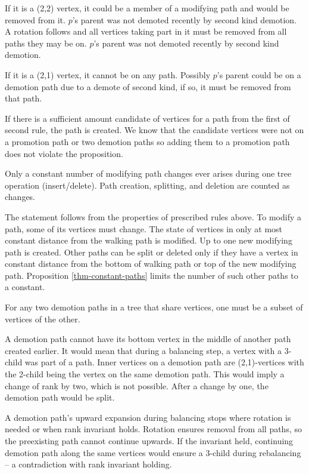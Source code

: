 \begin{myproof}
If it is a (2,2) vertex, it could be a member of a modifying path and would be removed from it. $p$'s parent was not demoted recently by second kind demotion. A rotation follows and all vertices taking part in it must be removed from all paths they may be on. $p$'s parent was not demoted recently by second kind demotion.

If it is a (2,1) vertex, it cannot be on any path. Possibly $p$'s parent could be on a demotion path due to a demote of second kind, if so, it must be removed from that path.

If there is a sufficient amount candidate of vertices for a path from the first of second rule, the path is created. We know that the candidate vertices were not on a promotion path or two demotion paths so adding them to a promotion path does not violate the proposition.
\end{myproof}

\begin{prop}
Only a constant number of modifying path changes ever arises during one tree operation (insert/delete). Path creation, splitting, and deletion are counted as changes.
\end{prop}

\begin{myproof}
The statement follows from the properties of prescribed rules above. To modify a path, some of its vertices must change. The state of vertices in only at most constant distance from the walking path is modified. Up to one new modifying path is created. Other paths can be split or deleted only if they have a vertex in constant distance from the bottom of walking path or top of the new modifying path. Proposition \ref{thm-constant-paths} limits the number of such other paths to a constant.
\end{myproof}

\begin{prop}
For any two demotion paths in a tree that share vertices, one must be a subset of vertices of the other.
\end{prop}

\begin{myproof}
A demotion path cannot have its bottom vertex in the middle of another path created earlier. It would mean that during a balancing step, a vertex with a 3-child was part of a path. Inner vertices on a demotion path are (2,1)-vertices with the 2-child being the vertex on the same demotion path. This would imply a change of rank by two, which is not possible. After a change by one, the demotion path would be split.

A demotion path's upward expansion during balancing stops where rotation is needed or when rank invariant holds. Rotation ensures removal from all paths, so the preexisting path cannot continue upwards. If the invariant held, continuing demotion path along the same vertices would ensure a 3-child during rebalancing -- a contradiction with rank invariant holding.
\end{myproof}

